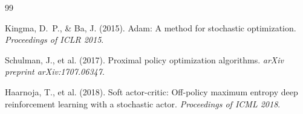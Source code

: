\documentclass[12pt,a4paper]{article}
\begin{document}
\begin{thebibliography}{99}

Kingma, D.~P., \& Ba, J. (2015).
Adam: A method for stochastic optimization.
\textit{Proceedings of ICLR 2015}.

Schulman, J., et al. (2017).
Proximal policy optimization algorithms.
\textit{arXiv preprint arXiv:1707.06347}.

Haarnoja, T., et al. (2018).
Soft actor-critic: Off-policy maximum entropy deep reinforcement learning with
a stochastic actor.
\textit{Proceedings of ICML 2018}.

\end{thebibliography}
\end{document}
